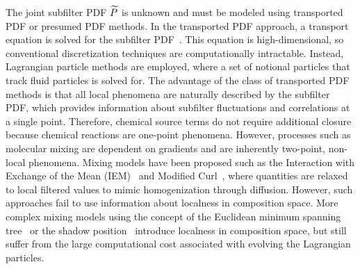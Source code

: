 The joint subfilter PDF $\widetilde{P}$ is unknown and must be modeled using transported PDF or presumed PDF methods. In the transported PDF approach, a transport equation is solved for the subfilter PDF~\cite{pope1985,pope1991}. This equation is high-dimensional, so conventional discretization techniques are computationally intractable. Instead, Lagrangian particle methods are employed, where a set of notional particles that track fluid particles is solved for. The advantage of the class of transported PDF methods is that all local phenomena are naturally described by the subfilter PDF, which provides information about subfilter fluctuations and correlations at a single point. Therefore, chemical source terms do not require additional closure because chemical reactions are one-point phenomena. However, processes such as molecular mixing are dependent on gradients and are inherently two-point, non-local phenomena. Mixing models have been proposed such as the Interaction with Exchange of the Mean (IEM)~\cite{dopazo1974} and Modified Curl~\cite{janicka1979}, where quantities are relaxed to local filtered values to mimic homogenization through diffusion. However, such approaches fail to use information about localness in composition space. More complex mixing models using the concept of the Euclidean minimum spanning tree~\cite{subramaniam1998} or the shadow position~\cite{pope2013} introduce localness in composition space, but still suffer from the large computational cost associated with evolving the Lagrangian particles.


